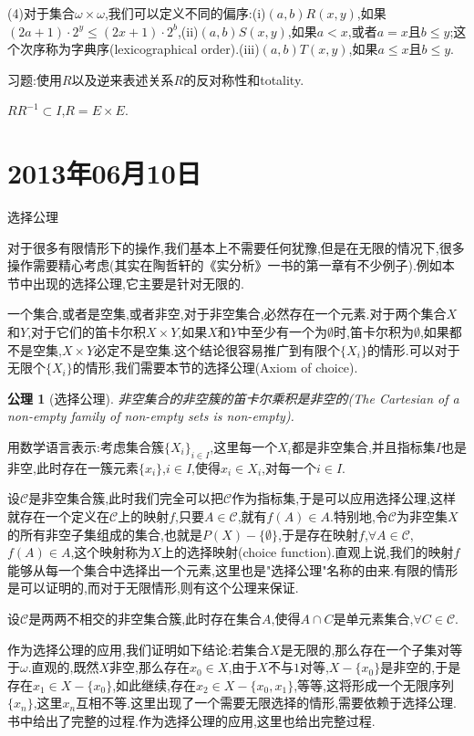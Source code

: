 \documentclass[12pt,a4paper,openany]{book}
\newtheorem{axiom}{公理}[section]
\begin{document}
(4)对于集合$\omega \times \omega$,我们可以定义不同的偏序:(i)$(a,b)R(x,y)$,如果$(2a+1)\cdot 2^y \le (2x+1) \cdot 2^b$,(ii)$(a,b)S(x,y)$,如果$a<x$,或者$a=x$且$b \le y$;这个次序称为字典序(lexicographical order).(iii)$(a,b)T(x,y)$,如果$a \le x$且$b \le y$.

习题:使用$R$以及逆来表述关系$R$的反对称性和totality.

$RR^{-1} \subset I$,$R = E \times E$.

\section{2013年06月10日}
选择公理

对于很多有限情形下的操作,我们基本上不需要任何犹豫,但是在无限的情况下,很多操作需要精心考虑(其实在陶哲轩的《实分析》一书的第一章有不少例子).例如本节中出现的选择公理,它主要是针对无限的.

一个集合,或者是空集,或者非空,对于非空集合,必然存在一个元素.对于两个集合$X$和$Y$,对于它们的笛卡尔积$X \times Y$,如果$X$和$Y$中至少有一个为$\emptyset$时,笛卡尔积为$\emptyset$,如果都不是空集,$X \times Y$必定不是空集.这个结论很容易推广到有限个$\{X_i\}$的情形.可以对于无限个$\{X_i\}$的情形,我们需要本节的选择公理(Axiom of choice).

\begin{axiom}[选择公理]
非空集合的非空簇的笛卡尔乘积是非空的(The Cartesian of a non-empty family of non-empty sets is non-empty).
\end{axiom}

用数学语言表示:考虑集合簇$\{X_i\}_{i \in I}$,这里每一个$X_i$都是非空集合,并且指标集$I$也是非空,此时存在一簇元素$\{x_i\}$,$i \in I$,使得$x_i \in X_i$,对每一个$i \in I$.

设$\mathscr{C}$是非空集合簇,此时我们完全可以把$\mathscr{C}$作为指标集,于是可以应用选择公理,这样就存在一个定义在$\mathscr{C}$上的映射$f$,只要$A \in \mathscr{C}$,就有$f(A) \in A$.特别地,令$\mathscr{C}$为非空集$X$的所有非空子集组成的集合,也就是$P(X)-\{\emptyset\}$,于是存在映射$f$,$\forall A \in \mathscr{C}$,$f(A) \in A$,这个映射称为$X$上的选择映射(choice function).直观上说,我们的映射$f$能够从每一个集合中选择出一个元素,这里也是"选择公理"名称的由来.有限的情形是可以证明的,而对于无限情形,则有这个公理来保证.

设$\mathscr{C}$是两两不相交的非空集合簇,此时存在集合$A$,使得$A \cap C$是单元素集合,$\forall C \in \mathscr{C}$.

作为选择公理的应用,我们证明如下结论:若集合$X$是无限的,那么存在一个子集对等于$\omega$.直观的,既然$X$非空,那么存在$x_0 \in X$,由于$X$不与$1$对等,$X-\{x_0\}$是非空的,于是存在$x_1 \in X - \{x_0\}$,如此继续,存在$x_2 \in X - \{x_0,x_1\}$,等等,这将形成一个无限序列$\{x_n\}$,这里$x_n$互相不等.这里出现了一个需要无限选择的情形,需要依赖于选择公理.书中给出了完整的过程.作为选择公理的应用,这里也给出完整过程.
\end{document}

